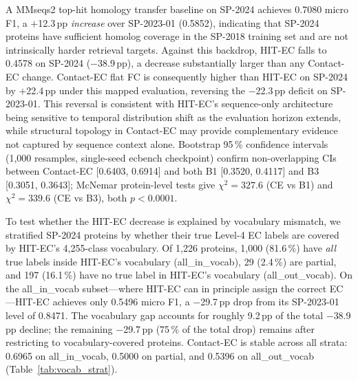 \documentclass[numbered,contemporary,mediumone]{oup-authoring-template}
\begin{document}
A MMseqs2 top-hit homology transfer baseline on SP-2024 achieves 0.7080
micro F1, a $+$12.3\,pp \emph{increase} over SP-2023-01 (0.5852), indicating
that SP-2024 proteins have sufficient homolog coverage in the SP-2018 training
set and are not intrinsically harder retrieval targets. Against this backdrop,
HIT-EC falls to 0.4578 on SP-2024 ($-$38.9\,pp), a decrease
substantially larger than any Contact-EC change. Contact-EC flat FC is consequently
higher than HIT-EC on SP-2024 by $+$22.4\,pp under this mapped evaluation, reversing the $-$22.3\,pp
deficit on SP-2023-01. This reversal is consistent with HIT-EC's sequence-only
architecture being sensitive to temporal distribution shift as the evaluation
horizon extends, while structural topology in Contact-EC may provide
complementary evidence not captured by sequence context alone. Bootstrap 95\,\% confidence
intervals (1{,}000 resamples, single-seed ecbench checkpoint) confirm
non-overlapping CIs between Contact-EC [0.6403, 0.6914] and both B1 [0.3520,
0.4117] and B3 [0.3051, 0.3643]; McNemar protein-level tests give
$\chi^2\!=\!327.6$ (CE vs B1) and $\chi^2\!=\!339.6$ (CE vs B3), both $p<0.0001$.

To test whether the HIT-EC decrease is explained by vocabulary
mismatch, we stratified SP-2024 proteins by whether their true Level-4
EC labels are covered by HIT-EC's 4{,}255-class vocabulary. Of 1{,}226
proteins, 1{,}000 (81.6\,\%) have \emph{all} true labels inside HIT-EC's
vocabulary (all\_in\_vocab), 29 (2.4\,\%) are partial, and 197 (16.1\,\%)
have no true label in HIT-EC's vocabulary (all\_out\_vocab).
On the all\_in\_vocab subset---where HIT-EC can in principle assign the
correct EC---HIT-EC achieves only 0.5496 micro F1, a $-$29.7\,pp drop
from its SP-2023-01 level of 0.8471. The vocabulary gap accounts for
roughly 9.2\,pp of the total $-$38.9\,pp decline; the remaining
$-$29.7\,pp (75\,\% of the total drop) remains after restricting to vocabulary-covered proteins.
Contact-EC is stable across all strata: 0.6965 on
all\_in\_vocab, 0.5000 on partial, and 0.5396 on all\_out\_vocab (Table~\ref{tab:vocab_strat}).
\end{document}
